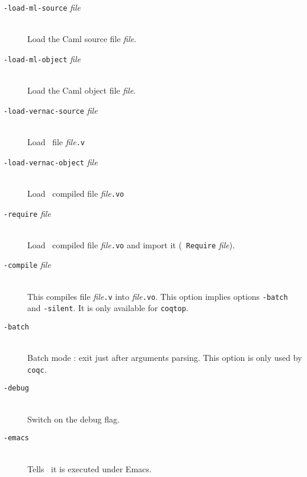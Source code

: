 \begin{description}
\item[{\tt -load-ml-source} {\em file}]\ \\
  Load the Caml source file {\em file}.

\item[{\tt -load-ml-object} {\em file}]\ \\
  Load the Caml object file {\em file}.

\item[{\tt -load-vernac-source} {\em file}]\ \\
  Load \Coq~file {\em file}{\tt .v}

\item[{\tt -load-vernac-object} {\em file}]\ \\
  Load \Coq~compiled file {\em file}{\tt .vo}

%
\item[{\tt -require} {\em file}]\ \\
  Load \Coq~compiled file {\em file}{\tt .vo} and import it ({\tt
    Require} {\em file}).

\item[{\tt -compile} {\em file}]\ \\
  This compiles file {\em file}{\tt .v} into {\em file}{\tt .vo}.
  This option implies options {\tt -batch} and {\tt -silent}. It is
  only available for {\tt coqtop}.


\item[{\tt -batch}]\ \\
  Batch mode : exit just after arguments parsing. This option is only
  used by {\tt coqc}.

\item[{\tt -debug}]\ \\
  Switch on the debug flag.

\item[{\tt -emacs}]\ \\
  Tells \Coq\ it is executed under Emacs.


\end{description}
